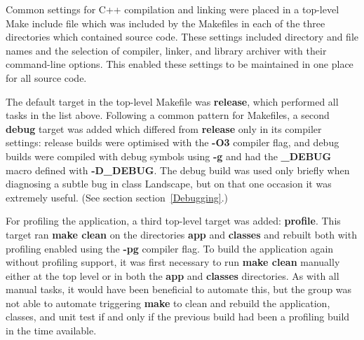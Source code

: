 Common settings for C++ compilation and linking were placed in a top-level Make include file which was included by the Makefiles in each of the three directories which contained source code.  These settings included directory and file names and the selection of compiler, linker, and library archiver with their command-line options.  This enabled these settings to be maintained in one place for all source code.  

The default target in the top-level Makefile was \textbf{release}, which performed all tasks in the list above.  Following a common pattern for Makefiles, a second \textbf{debug} target was added which differed from \textbf{release} only in its compiler settings: release builds were optimised with the \textbf{-O3} compiler flag, and debug builds were compiled with debug symbols using \textbf{-g} and had the \textbf{\_DEBUG} macro defined with \textbf{-D\_DEBUG}.  The debug build was used only briefly when diagnosing a subtle bug in class Landscape, but on that one occasion it was extremely useful.  (See section section~\ref{Debugging}.)

For profiling the application, a third top-level target was added: \textbf{profile}.  This target ran \textbf{make clean} on the directories \textbf{app} and \textbf{classes} and rebuilt both with profiling enabled using the \textbf{-pg} compiler flag.  To build the application again without profiling support, it was first necessary to run \textbf{make clean} manually either at the top level or in both the \textbf{app} and \textbf{classes} directories.  As with all manual tasks, it would have been beneficial to automate this, but the group was not able to automate triggering \textbf{make} to clean and rebuild the application, classes, and unit test if and only if the previous build had been a profiling build in the time available.